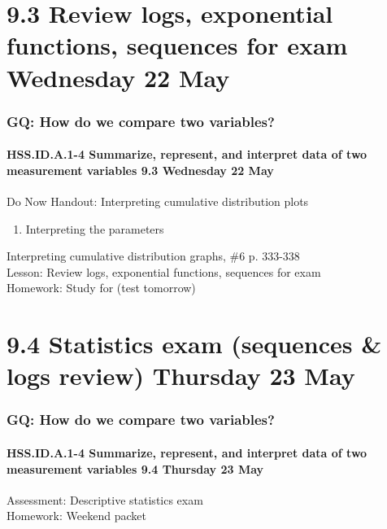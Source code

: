 \documentclass{beamer}
\begin{document}
\section{9.3 Review logs, exponential functions, sequences for exam Wednesday 22 May}
  \frame
  {
    \frametitle{GQ: How do we compare two variables?}
    \framesubtitle{HSS.ID.A.1-4 Summarize, represent, and interpret data of two measurement variables \hfill \alert{9.3 Wednesday 22 May}}

    \begin{block}{Do Now Handout: Interpreting cumulative distribution plots}
        \begin{enumerate}
          \item Interpreting the parameters
      \end{enumerate}
    \end{block}
    Interpreting cumulative distribution graphs, \#6 p. 333-338\\
    Lesson: Review logs, exponential functions, sequences for exam\\[0.5cm]
    Homework: Study for (\alert{test tomorrow})
  }

\section{9.4 Statistics exam (sequences \& logs review) Thursday 23 May}
  \frame
  {
    \frametitle{GQ: How do we compare two variables?}
    \framesubtitle{HSS.ID.A.1-4 Summarize, represent, and interpret data of two measurement variables \hfill \alert{9.4 Thursday 23 May}}

    Assessment: Descriptive statistics exam\\[0.5cm]
    Homework: Weekend packet
  }
\end{document}
